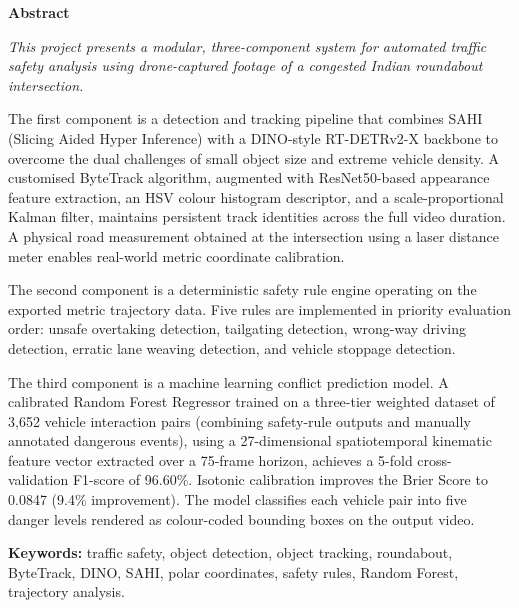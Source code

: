 \documentclass[12pt,a4paper]{report}
\begin{document}
\newpage\thispagestyle{empty}
\begin{center}{\bfseries Abstract}\end{center}
{\em\noindent
This project presents a modular, three-component system for automated traffic safety analysis
using drone-captured footage of a congested Indian roundabout intersection.

The first component is a detection and tracking pipeline that combines SAHI (Slicing Aided
Hyper Inference) with a DINO-style RT-DETRv2-X backbone to overcome the dual challenges of small
object size and extreme vehicle density.  A customised ByteTrack algorithm, augmented with
ResNet50-based appearance feature extraction, an HSV colour histogram descriptor, and a
scale-proportional Kalman filter, maintains persistent track identities across the full video
duration.  A physical road measurement obtained at the intersection using a laser distance meter
enables real-world metric coordinate calibration.

The second component is a deterministic safety rule engine operating on the exported metric
trajectory data.  Five rules are implemented in priority evaluation order: unsafe overtaking detection, tailgating detection, wrong-way driving detection, erratic lane weaving detection, and vehicle stoppage detection.

The third component is a machine learning conflict prediction model.  A calibrated Random
Forest Regressor trained on a three-tier weighted dataset of 3{,}652 vehicle interaction
pairs (combining safety-rule outputs and manually annotated dangerous events), using a
27-dimensional spatiotemporal kinematic feature vector extracted over a 75-frame horizon,
achieves a 5-fold cross-validation F1-score of 96.60\%.  Isotonic calibration improves the
Brier Score to 0.0847 (9.4\% improvement).  The model classifies each vehicle pair into five
danger levels rendered as colour-coded bounding boxes on the output video.

\medskip
\noindent\textbf{Keywords:} traffic safety, object detection, object tracking, roundabout,
ByteTrack, DINO, SAHI, polar coordinates, safety rules, Random Forest, trajectory analysis.
}

\clearpage\thispagestyle{empty}

\fancyhf{}
\fancyfoot[C]{\bfseries\thepage}
\renewcommand{\baselinestretch}{1}
\tableofcontents\clearpage
\end{document}
